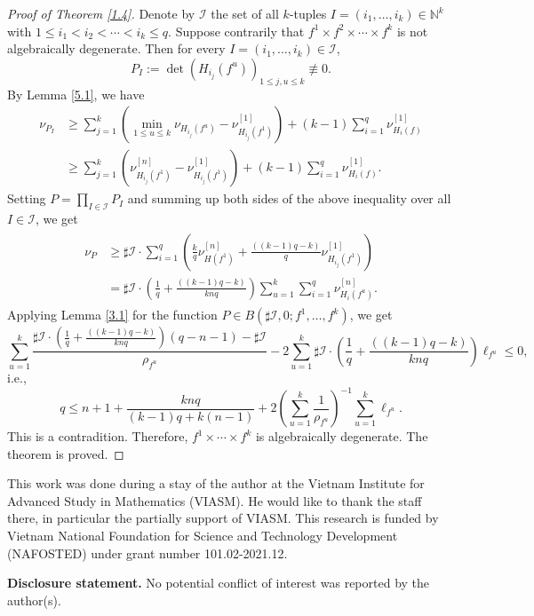 \documentclass[12pt, a4paper, oneside]{amsart}
\newcommand{\N}{\mathbb{N}}
\numberwithin{equation}{section}
\begin{document}
\begin{proof}[Proof of Theorem \ref{1.4}]

Denote by $\mathcal I$ the set of all $k$-tuples $I=(i_1,\ldots,i_k)\in \N^k$ with $1\le i_1<i_2<\cdots <i_k\le q$. Suppose contrarily that $f^1\times f^2\times\cdots\times f^k$ is not algebraically degenerate. Then for every $I=(i_1,\ldots,i_k)\in\mathcal I$,
$$ P_{I}:=\det \left (H_{i_j}(f^u)\right)_{1\le j,u\le k}\not\equiv 0. $$
By Lemma \ref{5.1}, we have
\begin{align*}
\nu_{P_I}&\ge\sum_{j=1}^k\left (\min_{1\le u\le k}\nu_{H_{i_j}(f^u)}-\nu^{[1]}_{H_{i_j}(f^1)}\right)+(k-1)\sum_{i=1}^q\nu^{[1]}_{H_i(f)}\\
&\ge\sum_{j=1}^k\left (\nu^{[n]}_{H_{i_j}(f^1)}-\nu^{[1]}_{H_{i_j}(f^1)}\right)+(k-1)\sum_{i=1}^q\nu^{[1]}_{H_i(f)}.
\end{align*}
Setting $P=\prod_{I\in\mathcal I}P_I$ and summing up both sides of the above inequality over all $I\in\mathcal I$, we get
\begin{align}\label{3.14}
\begin{split}
\nu_P&\ge\sharp\mathcal I\cdot\sum_{i=1}^q\left (\frac{k}{q}\nu^{[n]}_{H(f^1)}+\frac{((k-1)q-k)}{q}\nu^{[1]}_{H_{i_j}(f^1)}\right)\\
&=\sharp\mathcal I\cdot\left (\frac{1}{q}+\frac{((k-1)q-k)}{knq}\right)\sum_{u=1}^k\sum_{i=1}^q\nu^{[n]}_{H_i(f^u)}.
\end{split}
\end{align}
Applying Lemma \ref{3.1} for the function $P\in B(\sharp\mathcal I,0;f^1,\ldots,f^k)$, we get
$$\sum_{u=1}^k\frac{\sharp\mathcal I\cdot\left (\frac{1}{q}+\frac{((k-1)q-k)}{knq}\right)(q-n-1)-\sharp\mathcal I}{\rho_{f^u}}-2\sum_{u=1}^k\sharp\mathcal I\cdot \left (\frac{1}{q}+\frac{((k-1)q-k)}{knq}\right) \ell_{f^u}\le 0, $$
i.e.,
$$ q\le n+1+\frac{knq}{(k-1)q+k(n-1)}+2\left(\sum_{u=1}^k\frac{1}{\rho_{f^u}}\right)^{-1}\sum_{u=1}^k\ell_{f^u}.$$
This is a contradition. Therefore, $f^1\times\cdots\times f^k$ is algebraically degenerate. The theorem is proved.
\end{proof}

 This work was done during a stay of the author at the Vietnam Institute for Advanced Study in Mathematics (VIASM). He would like to thank the staff there, in particular the partially support of VIASM.  This research is funded by Vietnam National Foundation for Science and Technology Development (NAFOSTED) under grant number 101.02-2021.12. 


\noindent
{\bf Disclosure statement.} No potential conflict of interest was reported by the author(s).
\end{document}
